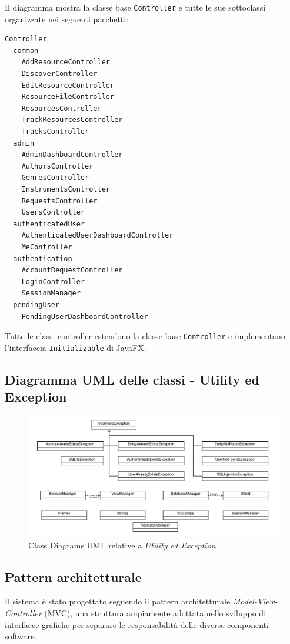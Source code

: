 \documentclass[a4paper]{article}
\begin{document}
Il diagramma mostra la classe base \texttt{Controller} e tutte le sue sottoclassi organizzate nei seguenti pacchetti:
\begin{lstlisting}[style=filetree]
Controller
  common
    AddResourceController
    DiscoverController
    EditResourceController
    ResourceFileController
    ResourcesController
    TrackResourcesController
    TracksController
  admin
    AdminDashboardController
    AuthorsController
    GenresController
    InstrumentsController
    RequestsController
    UsersController
  authenticatedUser
    AuthenticatedUserDashboardController
    MeController
  authentication
    AccountRequestController
    LoginController
    SessionManager
  pendingUser
    PendingUserDashboardController
\end{lstlisting}


Tutte le classi controller estendono la classe base \texttt{Controller} e implementano l'interfaccia \texttt{Initializable} di JavaFX.

\subsection{Diagramma UML delle classi - Utility ed Exception}
\begin{figure}[H]
    \centering
    \includegraphics[width=1.1 \textwidth]{./figures/uml_table_altri_package}
    \caption{Class Diagrams UML relative a \textit{Utility ed Exception}}
    \label{fig:uml_table_altri_package}
\end{figure}

\subsection{Pattern architetturale}
Il sistema è stato progettato seguendo il pattern architetturale \textit{Model-View-Controller} (MVC), una struttura ampiamente adottata nello sviluppo di interfacce grafiche per separare le responsabilità delle diverse componenti software.
\end{document}
